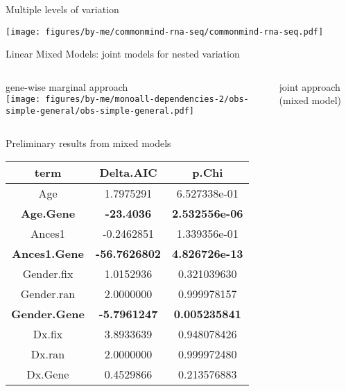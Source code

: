 \documentclass{beamer} %
\newcommand{\platefigscale}[0]{0.7}
\begin{document}
\begin{frame}{Multiple levels of variation}
\begin{center}
\texttt{[image: figures/by-me/commonmind-rna-seq/commonmind-rna-seq.pdf]}
\end{center}
\end{frame}

\begin{frame}{Linear Mixed Models: joint models for nested variation}
\begin{columns}[t]
\begin{column}{0.5\textwidth}
\begin{center}
gene-wise marginal approach\\

\texttt{[image: figures/by-me/monoall-dependencies-2/obs-simple-general/obs-simple-general.pdf]}
\end{center}
\end{column}

\begin{column}{0.5\textwidth}
\begin{center}
joint approach (mixed model)\\

\bigskip\bigskip

\end{center}
\end{column}
\end{columns}
\end{frame}

\begin{frame}{Preliminary results from mixed models}
\begin{tabular}{ccc}
term        &   Delta.AIC &        p.Chi \\
\hline
\hline
Age         &   1.7975291 &  6.527338e-01 \\
\hline
\textbf{Age.Gene}    & \textbf{-23.4036}    &  \textbf{2.532556e-06} \\
\hline
Ances1      &  -0.2462851 &  1.339356e-01 \\
\textbf{Ances1.Gene} & \textbf{-56.7626802} &  \textbf{4.826726e-13} \\
\hline
Gender.fix  &   1.0152936 &  0.321039630 \\
Gender.ran  &   2.0000000 &  0.999978157 \\
\textbf{Gender.Gene} &  \textbf{-5.7961247} &  \textbf{0.005235841} \\
Dx.fix      &   3.8933639 &  0.948078426 \\
Dx.ran      &   2.0000000 &  0.999972480 \\
Dx.Gene     &   0.4529866 &  0.213576883 \\
\hline
\end{tabular}

\end{frame}
\end{document}
